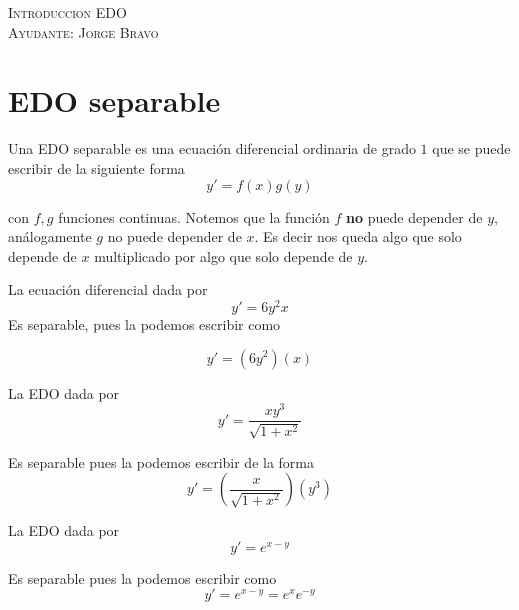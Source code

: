 \documentclass[a4paper,oneside,10.5pt]{article}
\begin{document}
\begin{center}
{\Large \textsc{Introduccion EDO}}\\
\vspace{1em}
\textsc{Ayudante: Jorge Bravo}\\
\end{center}

\section*{EDO separable}
Una EDO separable es una ecuación diferencial ordinaria de grado $1$ que se puede escribir de la siguiente forma
\begin{equation*}
y' = f(x)g(y)
\end{equation*}

con $f, g$ funciones continuas. Notemos que la función $f$ \textbf{no} puede depender de $y$, análogamente $g$ no puede depender de $x$. Es decir nos queda algo que solo depende de $x$ multiplicado por algo que solo depende de $y$.

\begin{ejemplo}
  La ecuación diferencial dada por
  \begin{equation*}
    y' = 6y^{2}x
  \end{equation*}
  Es separable, pues la podemos escribir como

  \begin{equation*}
    y' = (6y^{2})(x)
  \end{equation*}
\end{ejemplo}

\begin{ejemplo}
La EDO dada por
\begin{equation*}
y' = \frac{xy^{3}}{\sqrt{1+x^{2}}}
\end{equation*}

Es separable pues la podemos escribir de la forma
\begin{equation*}
y' = (\frac{x}{\sqrt{1+x^{2}}})(y^{3})
\end{equation*}
\end{ejemplo}

\begin{ejemplo}
  La EDO dada por
  \begin{equation*}
    y' = e^{x - y}
  \end{equation*}

  Es separable pues la podemos escribir como
  \begin{equation*}
    y' = e^{x - y} = e^{x}e^{-y}
  \end{equation*}
\end{ejemplo}
\end{document}
